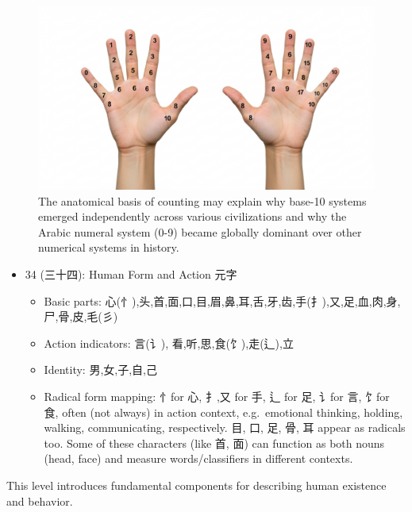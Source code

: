\begin{figure}
\centering
\includegraphics{./images/10-fingers.jpg}
\caption{The anatomical basis of counting may explain why base-10
systems emerged independently across various civilizations and why the
Arabic numeral system (0-9) became globally dominant over other
numerical systems in history.}
\end{figure}

\begin{itemize}
\tightlist
\item
  34 (三十四): Human Form and Action 元字

  \begin{itemize}
  \tightlist
  \item
    Basic parts:
    心(忄),头,首,面,口,目,眉,鼻,耳,舌,牙,齿,手(扌),又,足,血,肉,身,尸,骨,皮,毛(彡)
  \item
    Action indicators: 言(讠), 看,听,思,食(饣),走(辶),立
  \item
    Identity: 男,女,子,自,己
  \item
    Radical form mapping: 忄for 心, 扌,又 for 手, 辶 for 足, 讠for 言,
    饣for 食, often (not always) in action context, e.g.~emotional
    thinking, holding, walking, communicating, respectively. 目, 口, 足,
    骨, 耳 appear as radicals too. Some of these characters (like 首,
    面) can function as both nouns (head, face) and measure
    words/classifiers in different contexts.
  \end{itemize}
\end{itemize}

This level introduces fundamental components for describing human
existence and behavior.

